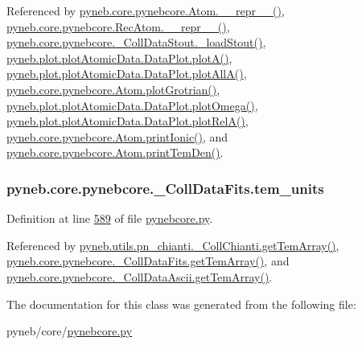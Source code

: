 Referenced by \hyperlink{pynebcore_8py_source_l02615}{pyneb.\-core.\-pynebcore.\-Atom.\-\_\-\-\_\-repr\-\_\-\-\_\-()}, \hyperlink{pynebcore_8py_source_l03154}{pyneb.\-core.\-pynebcore.\-Rec\-Atom.\-\_\-\-\_\-repr\-\_\-\-\_\-()}, \hyperlink{pynebcore_8py_source_l01178}{pyneb.\-core.\-pynebcore.\-\_\-\-Coll\-Data\-Stout.\-\_\-load\-Stout()}, \hyperlink{plot_atomic_data_8py_source_l00117}{pyneb.\-plot.\-plot\-Atomic\-Data.\-Data\-Plot.\-plot\-A()}, \hyperlink{plot_atomic_data_8py_source_l00189}{pyneb.\-plot.\-plot\-Atomic\-Data.\-Data\-Plot.\-plot\-All\-A()}, \hyperlink{pynebcore_8py_source_l02443}{pyneb.\-core.\-pynebcore.\-Atom.\-plot\-Grotrian()}, \hyperlink{plot_atomic_data_8py_source_l00373}{pyneb.\-plot.\-plot\-Atomic\-Data.\-Data\-Plot.\-plot\-Omega()}, \hyperlink{plot_atomic_data_8py_source_l00262}{pyneb.\-plot.\-plot\-Atomic\-Data.\-Data\-Plot.\-plot\-Rel\-A()}, \hyperlink{pynebcore_8py_source_l02233}{pyneb.\-core.\-pynebcore.\-Atom.\-print\-Ionic()}, and \hyperlink{pynebcore_8py_source_l02324}{pyneb.\-core.\-pynebcore.\-Atom.\-print\-Tem\-Den()}.

\hypertarget{classpyneb_1_1core_1_1pynebcore_1_1___coll_data_fits_a0ec412b766393f099d604527da57c565}{
\subsubsection[{tem\-\_\-units}]{\setlength{\rightskip}{0pt plus 5cm}pyneb.\-core.\-pynebcore.\-\_\-\-Coll\-Data\-Fits.\-tem\-\_\-units}}\label{classpyneb_1_1core_1_1pynebcore_1_1___coll_data_fits_a0ec412b766393f099d604527da57c565}


Definition at line \hyperlink{pynebcore_8py_source_l00589}{589} of file \hyperlink{pynebcore_8py_source}{pynebcore.\-py}.



Referenced by \hyperlink{pn__chianti_8py_source_l00551}{pyneb.\-utils.\-pn\-\_\-chianti.\-\_\-\-Coll\-Chianti.\-get\-Tem\-Array()}, \hyperlink{pynebcore_8py_source_l00897}{pyneb.\-core.\-pynebcore.\-\_\-\-Coll\-Data\-Fits.\-get\-Tem\-Array()}, and \hyperlink{pynebcore_8py_source_l01129}{pyneb.\-core.\-pynebcore.\-\_\-\-Coll\-Data\-Ascii.\-get\-Tem\-Array()}.



The documentation for this class was generated from the following file\-:\begin{DoxyCompactItemize}
\item 
pyneb/core/\hyperlink{pynebcore_8py}{pynebcore.\-py}\end{DoxyCompactItemize}
